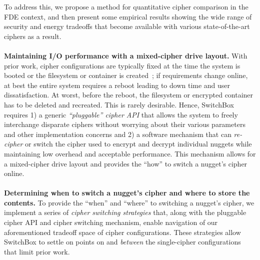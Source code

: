 To address this, we propose a method for quantitative cipher comparison in the
FDE context, and then present some empirical results showing the wide range of
security and energy tradeoffs that become available with various
state-of-the-art ciphers as a result.\\
\\
\textbf{Maintaining I/O performance with a mixed-cipher drive layout.} With
prior work, cipher configurations are typically fixed at the time the system is
booted or the filesystem or container is created~\cite{CiteAllTheFilesystems};
if requirements change online, at best the entire system requires a reboot
leading to down time and user dissatisfaction. At worst, before the reboot, the
filesystem or encrypted container has to be deleted and recreated. This is
rarely desirable. Hence, SwitchBox requires 1) a generic \emph{``pluggable''
cipher API} that allows the system to freely interchange disparate ciphers
without worrying about their various parameters and other implementation
concerns and 2) a software mechanism that can \emph{re-cipher} or switch the
cipher used to encrypt and decrypt individual nuggets while maintaining low
overhead and acceptable performance. This mechanism allows for a mixed-cipher
drive layout and provides the ``how'' to switch a nugget's cipher online.\\
\\
\textbf{Determining when to switch a nugget's cipher and where to store the
contents.} To provide the ``when'' and ``where'' to switching a nugget's cipher,
we implement a series of \textit{cipher switching strategies} that, along with
the pluggable cipher API and cipher switching mechanism, enable navigation of
our aforementioned tradeoff space of cipher configurations. These strategies
allow SwitchBox to settle on points on and \emph{between} the single-cipher
configurations that limit prior work.
